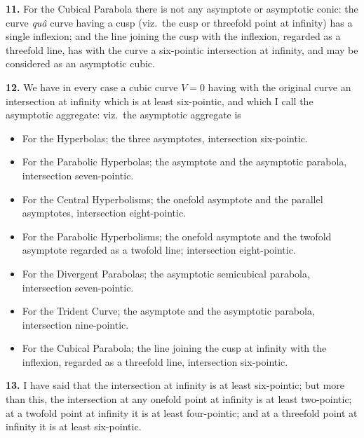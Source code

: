 \documentclass[11pt,a4paper]{article}
\begin{document}
\medskip

\textbf{11.} For the Cubical Parabola there is not any asymptote or asymptotic conic: the curve \emph{qu\^a} curve having a cusp (viz.\ the cusp or threefold point at infinity) has a single inflexion; and the line joining the cusp with the inflexion, regarded as a threefold line, has with the curve a six-pointic intersection at infinity, and may be considered as an asymptotic cubic.

\medskip

\textbf{12.} We have in every case a cubic curve $V=0$ having with the original curve an intersection at infinity which is at least six-pointic, and which I call the asymptotic aggregate: viz.\ the asymptotic aggregate is
\begin{itemize}\itemsep0pt
\item For the Hyperbolas; the three asymptotes, intersection six-pointic.
\item For the Parabolic Hyperbolas; the asymptote and the asymptotic parabola, intersection seven-pointic.
\item For the Central Hyperbolisms; the onefold asymptote and the parallel asymptotes, intersection eight-pointic.
\item For the Parabolic Hyperbolisms; the onefold asymptote and the twofold asymptote regarded as a twofold line; intersection eight-pointic.
\item For the Divergent Parabolas; the asymptotic semicubical parabola, intersection seven-pointic.
\item For the Trident Curve; the asymptote and the asymptotic parabola, intersection nine-pointic.
\item For the Cubical Parabola; the line joining the cusp at infinity with the inflexion, regarded as a threefold line, intersection six-pointic.
\end{itemize}

\textbf{13.} I have said that the intersection at infinity is at least six-pointic; but more than this, the intersection at any onefold point at infinity is at least two-pointic; at a twofold point at infinity it is at least four-pointic; and at a threefold point at infinity it is at least six-pointic.
\end{document}

